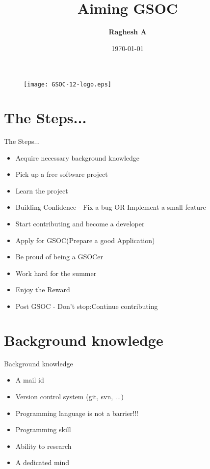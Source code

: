 \documentclass{beamer}
\title{Aiming GSOC}
\author{\textbf{Raghesh A}}
\date{\today}
\begin{document}
\begin{frame}
\titlepage
\end{frame}


\section[Outline]{}

\begin{frame}{}
\begin{figure}
\texttt{[image: GSOC-12-logo.eps]}
\end{figure}
\end{frame}

\frame{\tableofcontents}
\section{The Steps...}
\begin{frame}{The Steps...}
\begin{itemize}
\item Acquire necessary background knowledge
\item Pick up a free software project
\item Learn the project
\item Building Confidence - Fix a bug OR Implement a small feature
\item Start contributing and become a developer
\item Apply for GSOC(Prepare a good Application)
\item Be proud of being a GSOCer
\item Work hard for the summer
\item Enjoy the Reward
\item Post GSOC - Don't stop:Continue contributing
\end{itemize}
\end{frame}

\section{Background knowledge}
\begin{frame}{Background knowledge}
\begin{itemize}
\item A mail id
\item Version control system (git, svn, ...)
\item Programming language is not a barrier!!!
\item Programming skill
\item Ability to research
\item A dedicated mind
\end{itemize}
\end{frame}
\end{document}
